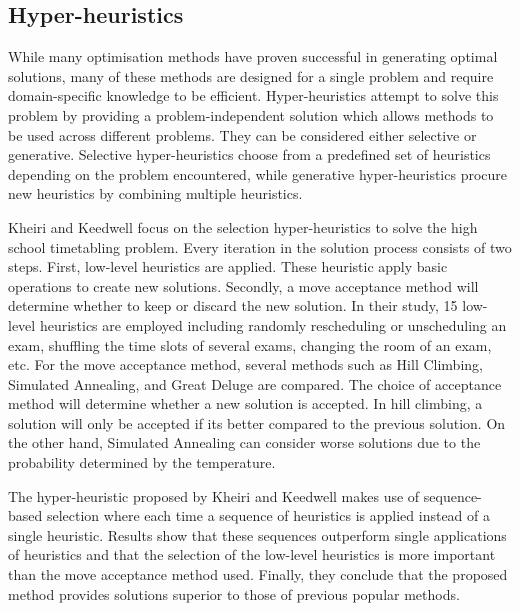 \subsection{Hyper-heuristics}

While many optimisation methods have proven successful in generating optimal solutions, many of these methods are designed for a single problem and require domain-specific knowledge to be efficient. Hyper-heuristics attempt to solve this problem by providing a problem-independent solution which allows  methods to be used across different problems. They can be considered either selective or generative. Selective hyper-heuristics choose from a predefined set of heuristics depending on the problem encountered, while generative hyper-heuristics procure new heuristics by combining multiple heuristics.

Kheiri and Keedwell \cite{kheiri2017} focus on the selection hyper-heuristics to solve the high school timetabling problem. Every iteration in the solution process consists of two steps. First, low-level heuristics are applied. These heuristic apply basic operations to create new solutions. Secondly, a move acceptance method will determine whether to keep or discard the new solution. In their study, 15 low-level heuristics are employed including randomly rescheduling or unscheduling an exam, shuffling the time slots of several exams, changing the room of an exam, etc. For the move acceptance method, several methods such as Hill Climbing, Simulated Annealing, and Great Deluge are compared. The choice of acceptance method will determine whether a new solution is accepted. In hill climbing, a solution will only be accepted if its better compared to the previous solution. On the other hand, Simulated Annealing can consider worse solutions due to the probability determined by the temperature.

The hyper-heuristic proposed by Kheiri and Keedwell makes use of sequence-based selection where each time a sequence of heuristics is applied instead of a single heuristic. Results show that these sequences outperform single applications of heuristics and that the selection of the low-level heuristics is more important than the move acceptance method used. Finally, they conclude that the proposed method provides solutions superior to those of previous popular methods.


